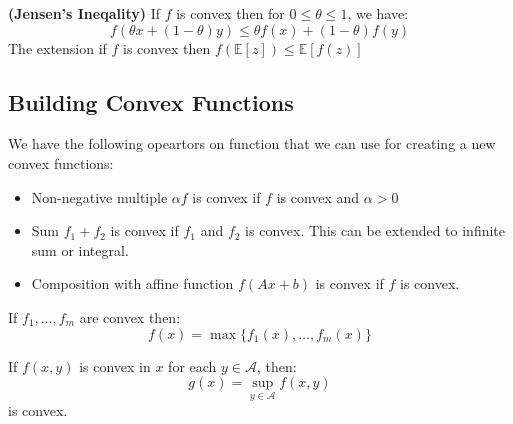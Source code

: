 \begin{definition}{\textbf{(Jensen's Ineqality)}}
    If $f$ is convex then for $0\le\theta\le1$, we have:
    \begin{equation*}
        f(\theta x + (1-\theta)y) \le \theta f(x) + (1-\theta)f(y)
    \end{equation*}
    The extension if $f$ is convex then $f(\mathbb{E}[z]) \le \mathbb{E}[f(z)]$
\end{definition}


\subsection{Building Convex Functions}


\begin{proposition}
    We have the following opeartors on function that we can use for creating a new convex functions:
    \begin{itemize}
        \item Non-negative multiple $\alpha f$ is convex if $f$ is convex and $\alpha > 0$
        \item Sum $f_1 + f_2$ is convex if $f_1$ and $f_2$ is convex. This can be extended to infinite sum or integral.
        \item Composition with affine function $f(Ax + b)$ is convex if $f$ is convex.
    \end{itemize}
\end{proposition}

\begin{proposition}
    If $f_1,\dots,f_m$ are convex then:
    \begin{equation*}
        f(x) = \max\Big\{ f_1(x), \dots, f_m(x) \Big\}
    \end{equation*}
\end{proposition}

\begin{proposition}
    If $f(x, y)$ is convex in $x$ for each $y\in\mathcal{A}$, then:
    \begin{equation*}
        g(x) = \sup_{y\in\mathcal{A}}f(x, y)
    \end{equation*}
    is convex.
\end{proposition}

